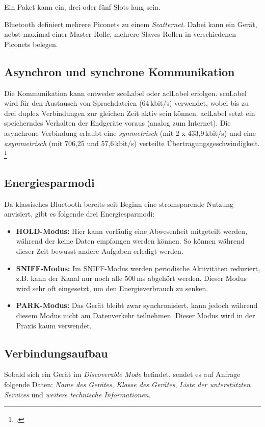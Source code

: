 Ein Paket kann ein, drei oder fünf Slots lang sein.

Bluetooth definiert mehrere Piconets zu einem \textit{Scatternet}.
Dabei kann ein Gerät, nebst maximal einer Master-Rolle, mehrere Slaves-Rollen in verschiedenen Piconets belegen.

\subsection{Asynchron und synchrone Kommunikation}
Die Kommunikation kann entweder \gls{scoLabel} oder \gls{aclLabel} erfolgen.
\gls{scoLabel} wird für den Austausch von Sprachdateien (64\,kbit/s) verwendet, wobei bis zu drei duplex Verbindungen zur gleichen Zeit aktiv sein können.
\gls{aclLabel} setzt ein speicherndes Verhalten der Endgeräte voraus (analog zum Internet). Die asynchrone Verbindung erlaubt eine \textit{symmetrisch} (mit 2 x 433,9\,kbit/s) und eine \textit{asymmetrisch} (mit 706,25 und 57,6\,kbit/s) verteilte Übertragungsgeschwindigkeit.
\footcite{Nahfunktechnik_in_Smartphones_FAQ_cio.de_2015-04-24}


\subsection{Energiesparmodi}
\label{subsec:energymode}
Da klassisches Bluetooth bereits seit Beginn eine stromsparende Nutzung anvisiert, gibt es folgende drei Energiesparmodi:
\begin{itemize}
	\item \textbf{HOLD-Modus:} Hier kann vorläufig eine Abwesenheit mitgeteilt werden, während der keine Daten empfangen werden können. So können während dieser Zeit bewusst andere Aufgaben erledigt werden.
	\item \textbf{SNIFF-Modus:} Im SNIFF-Modus werden periodische Aktivitäten reduziert, z.B. kann der Kanal nur noch alle 500\,ms abgehört werden.
	Dieser Modus wird sehr oft eingesetzt, um den Energieverbrauch zu senken.
	\item \textbf{PARK-Modus:} Das Gerät bleibt zwar synchronisiert, kann jedoch während diesem Modus nicht am Datenverkehr teilnehmen. Dieser Modus wird in der Praxis kaum verwendet.
\end{itemize}


\subsection{Verbindungsaufbau}
\label{sec:connectionSetup}
Sobald sich ein Gerät im \textit{Discoverable Mode} befindet, sendet es auf Anfrage folgende Daten: \textit{Name des Gerätes}, \textit{Klasse des Gerätes}, \textit{Liste der unterstützten Services} und \textit{weitere technische Informationen}.

